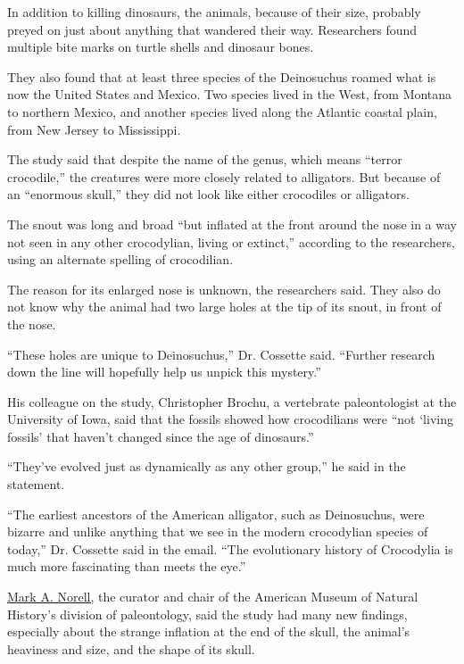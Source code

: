 In addition to killing dinosaurs, the animals, because of their size,
probably preyed on just about anything that wandered their way.
Researchers found multiple bite marks on turtle shells and dinosaur
bones.

They also found that at least three species of the Deinosuchus roamed
what is now the United States and Mexico. Two species lived in the West,
from Montana to northern Mexico, and another species lived along the
Atlantic coastal plain, from New Jersey to Mississippi.

The study said that despite the name of the genus, which means ``terror
crocodile,''
\href{https://www.nationalgeographic.com/news/2010/3/100323-giant-croc-crocodile-dinosaurs-deinosuchus-feces-poop/\#close}{}the
creatures were more closely related to alligators. But because of an
``enormous skull,'' they did not look like either crocodiles or
alligators.

The snout was long and broad ``but inflated at the front around the nose
in a way not seen in any other crocodylian, living or extinct,''
according to the researchers, using an alternate spelling of
crocodilian.

The reason for its enlarged nose is unknown, the researchers said. They
also do not know why the animal had two large holes at the tip of its
snout, in front of the nose.

``These holes are unique to Deinosuchus,'' Dr. Cossette said. ``Further
research down the line will hopefully help us unpick this mystery.''

His colleague on the study, Christopher Brochu, a vertebrate
paleontologist at the University of Iowa, said that the fossils showed
how crocodilians were ``not `living fossils' that haven't changed since
the age of dinosaurs.''

``They've evolved just as dynamically as any other group,'' he said in
the statement.

``The earliest ancestors of the American alligator, such as Deinosuchus,
were bizarre and unlike anything that we see in the modern crocodylian
species of today,'' Dr. Cossette said in the email. ``The evolutionary
history of Crocodylia is much more fascinating than meets the eye.''

\href{https://www.nytimes3xbfgragh.onion/2016/02/28/nyregion/how-mark-norell-a-paleontologist-spends-his-sundays.html}{Mark
A. Norell,} the curator and chair of the American Museum of Natural
History's division of paleontology, said the study had many new
findings, especially about the strange inflation at the end of the
skull, the animal's heaviness and size, and the shape of its skull.

